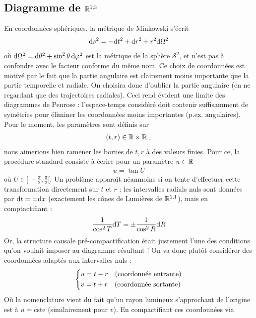 {\subsection{Diagramme de $\mathbb{R}^{1,3}$}
En coordonnées sphériques, la métrique de Minkowski s'écrit
\begin{align}
    \mathrm{d} s^2 = - \mathrm{d} t^2 + \mathrm{d} r^2 + r^2 \mathrm{d} \Omega^2
\end{align}
où $\mathrm{d} \Omega^2 = \mathrm{d} \theta^2 + \sin^2\theta \, \mathrm{d} \varphi^2$ est la métrique de la sphère $\mathcal{S}^2$, et n'est pas à confondre avec le facteur conforme du même nom. Ce choix de coordonnées est motivé par le fait que la partie angulaire est clairement moins importante que la partie temporelle et radiale. On choisira donc d'oublier la partie angulaire (en ne regardant que des trajectoires radiales). Ceci rend évident une limite des diagrammes de Penrose : l'espace-temps considéré doit contenir suffisamment de symétries pour éliminer les coordonnées moins importantes (p.ex. angulaires). Pour le moment, les paramètres sont définis sur 
\begin{align}
    (t,r) \in \mathbb{R} \times \mathbb{R}_+ 
\end{align}
nous aimerions bien ramener les bornes de $t,r$ à des valeurs finies. Pour ce, la procédure standard consiste à écrire pour un paramètre $u \in \mathbb{R}$
\begin{align}
    u = \tan U
\end{align}
où $U \in ]- \frac{\pi}{2},\frac{\pi}{2}[$. Un problème apparaît néanmoins si on tente d'effectuer cette transformation directement sur $t$ et $r$ : les intervalles radials nuls sont données par $\mathrm{d} t = \pm \mathrm{d} x$ (exactement les cônes de Lumières de $\mathbb{R}^{1,1}$), mais en comptactifiant :
\begin{align}
    \frac{1}{\cos^2T}\mathrm{d} T = \pm\frac{1}{\cos^2R} \mathrm{d} R
\end{align}
Or, la structure causale pré-compactification était justement l'une des conditions qu'on voulait imposer au diagramme résultant ! On va donc plutôt considérer des coordonnées adaptés aux intervalles nuls :
\begin{align}
    \begin{dcases}
        u = t - r \quad \text{(coordonnée entrante)}\\
        v = t + r \quad \text{(coordonnée sortante)}
    \end{dcases}
\end{align}
Où la nomenclature vient du fait qu'un rayon lumineux s'approchant de l'origine est à $u=$cste (similairement pour $v$). En compactifiant ces coordonnées via
}
